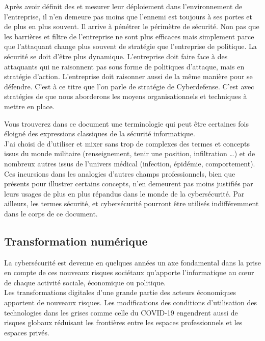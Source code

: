 Après avoir définit des  et mesurer leur déploiement dans l’environnement de l’entreprise, il n’en demeure pas moins que l’ennemi est toujours à ses portes et de plus en plus souvent. Il arrive à pénétrer le périmètre de sécurité.
Non pas que les barrières et filtre de l'entreprise ne sont plus efficaces mais simplement parce que l'attaquant change plus souvent de stratégie que l'entreprise de politique. La sécurité se doit d'être plus dynamique.
L’entreprise doit faire face à des attaquants qui ne raisonnent pas sous forme de politiques d’attaque, mais en stratégie d'action. L’entreprise doit raisonner aussi de la même manière pour se défendre. C'est à ce titre que l'on parle de stratégie de Cyberdefense.
C'est avec stratégies de  que nous aborderons les moyens organisationnels et techniques à mettre en place.

Vous trouverez  dans ce document une terminologie qui peut être certaines fois éloigné des expressions classiques de la sécurité informatique. \\
J'ai choisi de d'utiliser et mixer sans trop de complexes des termes et concepts issus du monde militaire (renseignement, tenir une position, infiltration …) et de nombreux autres issus de l'univers médical (infection, épidémie, comportement).\\ Ces incursions dans les analogies d'autres champs professionnels, bien que présents pour illustrer certains concepts, n'en demeurent pas moins justifiés par leurs usages de plus en plus répandus dans le monde de la cybersécurité. Par ailleurs, les termes sécurité, et cybersécurité pourront être utilisés indifféremment dans le corps de ce document.

\subsection {Transformation numérique}


La cybersécurité est devenue en quelques années un axe fondamental dans la prise en compte de ces nouveaux risques sociétaux qu'apporte l'informatique au cœur de chaque activité sociale, économique ou politique. \\

Les  transformations digitales d'une grande partie des acteurs économiques apportent de nouveaux risques. Les modifications des conditions d'utilisation des technologies dans les grises comme celle du COVID-19 engendrent aussi de risques globaux réduisant les frontières entre les espaces professionnels et les espaces privés.

